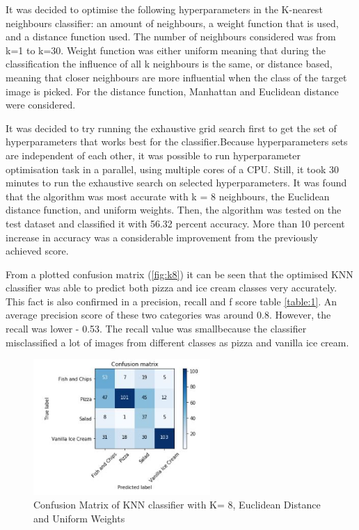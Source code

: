  It was decided to optimise the following hyperparameters in the  K-nearest neighbours classifier: an amount of neighbours, a weight function that is used, and a distance function used. The number of neighbours considered was from k=1 to k=30. Weight function was either uniform meaning that during the classification the influence of all k neighbours is the same, or distance based, meaning that closer neighbours are more influential when the class of the target image is picked.  For the distance function, Manhattan and Euclidean distance were considered.


It was decided to try running the exhaustive grid search first to get the set of hyperparameters that works best for the classifier.Because hyperparameters sets are independent of each other, it was possible to run hyperparameter optimisation task in a parallel, using multiple cores of a CPU. Still, it took 30 minutes to run the exhaustive search on selected hyperparameters. It was found that the algorithm was most accurate with k = 8 neighbours, the Euclidean distance function, and uniform weights. Then, the algorithm was tested on the test dataset and classified it with 56.32 percent accuracy. More than 10 percent increase in accuracy was a considerable improvement from the previously achieved score.

From a plotted confusion matrix (\autoref{fig:k8}) it can be seen that the optimised KNN classifier was able to predict both pizza and ice cream classes very accurately. This fact is also confirmed in a precision, recall and f score table \autoref{table:1}. An average precision score of these two categories was around 0.8. However, the recall was lower - 0.53. The recall value was smallbecause the classifier misclassified a lot of images from different classes as pizza and vanilla ice cream.



\begin{figure}[h]
\centering
\includegraphics[width=0.6\textwidth]{Figures/knn.JPG}
\caption{Confusion Matrix of KNN classifier with K= 8, Euclidean Distance and Uniform Weights}
\label{fig:k8}
\end{figure}

